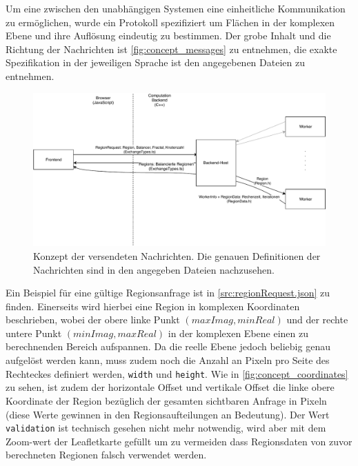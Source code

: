 Um eine zwischen den unabhängigen Systemen eine einheitliche Kommunikation zu ermöglichen,
wurde ein Protokoll spezifiziert um Flächen in der komplexen Ebene und ihre Auflösung eindeutig zu bestimmen.
Der grobe Inhalt und die Richtung der Nachrichten ist \autoref{fig:concept_messages} zu entnehmen,
die exakte Spezifikation in der jeweiligen Sprache ist den angegebenen Dateien zu entnehmen.

\begin{figure}
	\includegraphics[width=0.9\linewidth]{img/Implementierung/Nachrichtenuebersicht.pdf}
	\caption{Konzept der versendeten Nachrichten. Die genauen Definitionen der Nachrichten sind in den angegeben Dateien nachzusehen.}
	\label{fig:concept_messages}
\end{figure}


Ein Beispiel für eine gültige Regionsanfrage ist in \autoref{src:regionRequest.json} zu finden.
Einerseits wird hierbei eine Region in komplexen Koordinaten beschrieben, wobei der obere linke Punkt $(maxImag, minReal)$
und der rechte untere Punkt $(minImag, maxReal)$ in der komplexen Ebene einen zu berechnenden Bereich aufspannen.
Da die reelle Ebene jedoch beliebig genau aufgelöst werden kann, muss zudem noch die Anzahl an Pixeln
pro Seite des Rechteckes definiert werden, \verb|width| und \verb|height|.
Wie in \autoref{fig:concept_coordinates} zu sehen, ist zudem der horizontale Offset und vertikale Offset
die linke obere Koordinate der Region bezüglich der gesamten sichtbaren Anfrage in Pixeln (diese Werte
gewinnen in den Regionsaufteilungen an Bedeutung).
Der Wert \verb|validation| ist technisch gesehen nicht mehr notwendig, wird aber mit dem Zoom-wert der Leafletkarte gefüllt
um zu vermeiden dass Regionsdaten von zuvor berechneten Regionen falsch verwendet werden.

\begin{figure}
	
\end{figure}

